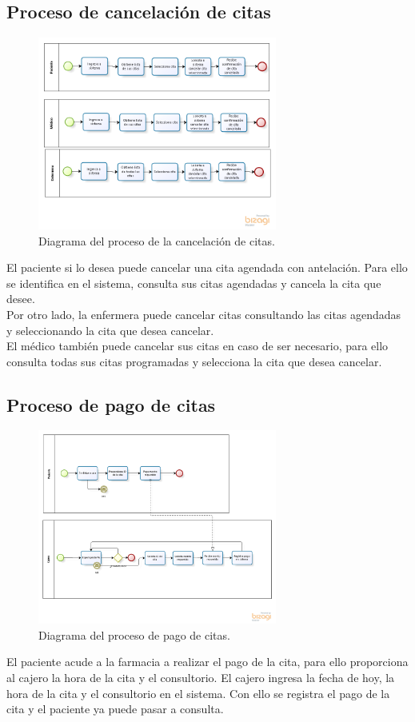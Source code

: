 \subsection{Proceso de cancelación de citas}
\begin{figure}[htbp!]
	\centering
	\includegraphics[width=0.7\textwidth]{images/procesos/cancelar_cita_new}
	\caption{Diagrama del proceso de la cancelación de citas.}
\end{figure}
El paciente si lo desea puede cancelar una cita agendada con antelación. Para ello se identifica en el sistema, consulta sus citas agendadas y cancela la cita que desee.\\
Por otro lado, la enfermera puede cancelar citas consultando las citas agendadas y seleccionando la cita que desea cancelar.\\
El médico también puede cancelar sus citas en caso de ser necesario, para ello consulta todas sus citas programadas y selecciona la cita que desea cancelar.

\subsection{Proceso de pago de citas}
\begin{figure}[htbp!]
		\centering
			\includegraphics[width=0.7\textwidth]{images/procesos/pago_consulta_new}
		\caption{Diagrama del proceso de pago de citas.}
	\end{figure}
El paciente acude a la farmacia a realizar el pago de la cita, para ello proporciona al cajero la hora de la cita y el consultorio. El cajero ingresa la fecha de hoy, la hora de la cita y el consultorio en el sistema. Con ello se registra el pago de la cita y el paciente ya puede pasar a consulta.
